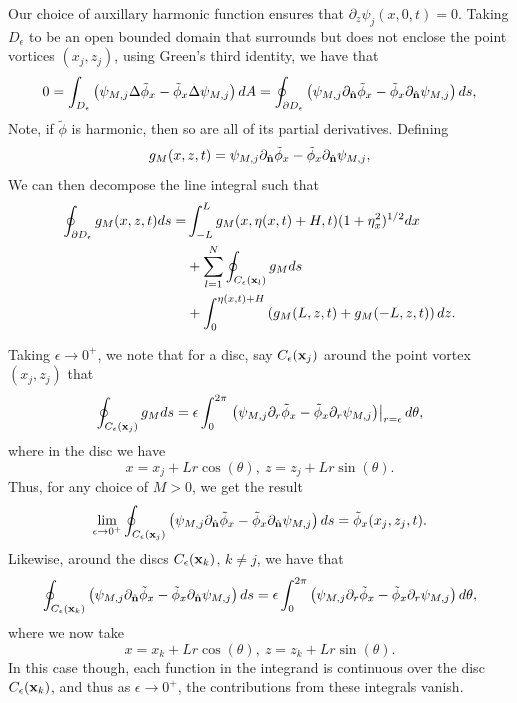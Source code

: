 \documentclass[a4paper,11pt]{article}
\newcommand{\p}{\partial}
\begin{document}
Our choice of auxillary harmonic function ensures that $\p_{z}\psi_{j}(x,0,t)=0$.  Taking $D_{\epsilon}$ to be an open bounded domain that surrounds but does not enclose the point vortices $(x_{j},z_{j})$, using Green's third identity, we have that 
\[
0 =  \int_{D_{\epsilon}}\left(\psi_{M,j}\Delta \tilde{\phi}_{x} - \tilde{\phi}_{x}\Delta\psi_{M,j} \right) dA =  \oint_{\p D_{\epsilon}} \left(\psi_{M,j}\p_{\hat{{\bf n}}}\tilde{\phi}_{x}-\tilde{\phi}_{x}\p_{\hat{{\bf n}}}\psi_{M,j} \right) ds,
\]
Note, if $\tilde{\phi}$ is harmonic, then so are all of its partial derivatives.  Defining
\[
g_{M}(x,z,t) = \psi_{M,j}\p_{\hat{{\bf n}}}\tilde{\phi}_{x}-\tilde{\phi}_{x}\p_{\hat{{\bf n}}}\psi_{M,j},
\]
We can then decompose the line integral such that 
\begin{align*}
\oint_{\p D_{\epsilon}} g_{M}(x,z,t) ds = & \int_{-L}^{L}g_{M}(x,\eta(x,t)+H,t) (1+\eta_{x}^{2})^{1/2}dx \\
& + \sum_{l=1}^{N} \oint_{C_{\epsilon}({\bf x}_{l})} g_{M} ds \\
& + \int_{0}^{\eta(x,t)+H} \left(g_{M}(L,z,t) + g_{M}(-L,z,t)\right) dz.  
\end{align*}

Taking $\epsilon \rightarrow 0^{+}$, we note that for a disc, say $C_{\epsilon}({\bf x}_{j})$  around the point vortex $(x_{j},z_{j})$ that 
\[
 \oint_{C_{\epsilon}({\bf x}_{j})} g_{M} ds =  \epsilon\int_{0}^{2\pi}\left.\left(\psi_{M,j}\p_{r}\tilde{\phi}_{x}- \tilde{\phi}_{x}\p_{r}\psi_{M,j} \right)\right|_{r=\epsilon} d\theta, 
\]
where in the disc we have 
\[
x = x_{j} + L r\cos(\theta), ~ z = z_{j} +  L r\sin(\theta).
\]
Thus, for any choice of $M>0$, we get the result 
\[
\lim_{\epsilon\rightarrow0^{+}}\oint_{C_{\epsilon}({\bf x}_{j})} \left(\psi_{M,j}\p_{\hat{{\bf n}}}\tilde{\phi}_{x}-\tilde{\phi}_{x}\p_{\hat{{\bf n}}}\psi_{M,j} \right) ds =\tilde{\phi}_{x}(x_{j},z_{j},t).
\]
Likewise, around the discs $C_{\epsilon}({\bf x}_{k})$, $k\neq j$, we have that 
\[
 \oint_{C_{\epsilon}({\bf x}_{k})} \left(\psi_{M,j}\p_{\hat{{\bf n}}}\tilde{\phi}_{x}-\tilde{\phi}_{x}\p_{\hat{{\bf n}}}\psi_{M,j} \right) ds = \epsilon\int_{0}^{2\pi}\left(\psi_{M,j}\p_{r}\tilde{\phi}_{x}- \tilde{\phi}_{x}\p_{r}\psi_{M,j} \right)d\theta, 
\]
where we now take 
\[
x = x_{k} + L r\cos(\theta), ~ z = z_{k} +  L r\sin(\theta).
\]
In this case though, each function in the integrand is continuous over the disc $C_{\epsilon}({\bf x}_{k})$, and thus as $\epsilon \rightarrow 0^{+}$, the contributions from these integrals vanish.  
\end{document}
